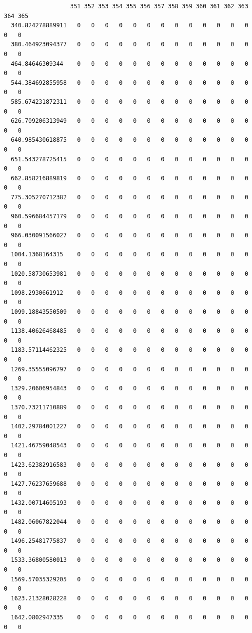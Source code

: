\documentclass[
  letterpaper,
  DIV=11,
  numbers=noendperiod]{scrartcl}
\begin{document}
\begin{verbatim}
                   351 352 353 354 355 356 357 358 359 360 361 362 363 364 365
  340.824278889911   0   0   0   0   0   0   0   0   0   0   0   0   0   0   0
  380.464923094377   0   0   0   0   0   0   0   0   0   0   0   0   0   0   0
  464.84646309344    0   0   0   0   0   0   0   0   0   0   0   0   0   0   0
  544.384692855958   0   0   0   0   0   0   0   0   0   0   0   0   0   0   0
  585.674231872311   0   0   0   0   0   0   0   0   0   0   0   0   0   0   0
  626.709206313949   0   0   0   0   0   0   0   0   0   0   0   0   0   0   0
  640.985430618875   0   0   0   0   0   0   0   0   0   0   0   0   0   0   0
  651.543278725415   0   0   0   0   0   0   0   0   0   0   0   0   0   0   0
  662.858216889819   0   0   0   0   0   0   0   0   0   0   0   0   0   0   0
  775.305270712382   0   0   0   0   0   0   0   0   0   0   0   0   0   0   0
  960.596684457179   0   0   0   0   0   0   0   0   0   0   0   0   0   0   0
  966.030091566027   0   0   0   0   0   0   0   0   0   0   0   0   0   0   0
  1004.1368164315    0   0   0   0   0   0   0   0   0   0   0   0   0   0   0
  1020.58730653981   0   0   0   0   0   0   0   0   0   0   0   0   0   0   0
  1098.2930661912    0   0   0   0   0   0   0   0   0   0   0   0   0   0   0
  1099.18843550509   0   0   0   0   0   0   0   0   0   0   0   0   0   0   0
  1138.40626468485   0   0   0   0   0   0   0   0   0   0   0   0   0   0   0
  1183.57114462325   0   0   0   0   0   0   0   0   0   0   0   0   0   0   0
  1269.35555096797   0   0   0   0   0   0   0   0   0   0   0   0   0   0   0
  1329.20606954843   0   0   0   0   0   0   0   0   0   0   0   0   0   0   0
  1370.73211710889   0   0   0   0   0   0   0   0   0   0   0   0   0   0   0
  1402.29784001227   0   0   0   0   0   0   0   0   0   0   0   0   0   0   0
  1421.46759048543   0   0   0   0   0   0   0   0   0   0   0   0   0   0   0
  1423.62382916583   0   0   0   0   0   0   0   0   0   0   0   0   0   0   0
  1427.76237659688   0   0   0   0   0   0   0   0   0   0   0   0   0   0   0
  1432.00714605193   0   0   0   0   0   0   0   0   0   0   0   0   0   0   0
  1482.06067822044   0   0   0   0   0   0   0   0   0   0   0   0   0   0   0
  1496.25481775837   0   0   0   0   0   0   0   0   0   0   0   0   0   0   0
  1533.36800580013   0   0   0   0   0   0   0   0   0   0   0   0   0   0   0
  1569.57035329205   0   0   0   0   0   0   0   0   0   0   0   0   0   0   0
  1623.21328028228   0   0   0   0   0   0   0   0   0   0   0   0   0   0   0
  1642.0802947335    0   0   0   0   0   0   0   0   0   0   0   0   0   0   0

\end{verbatim}
\end{document}
